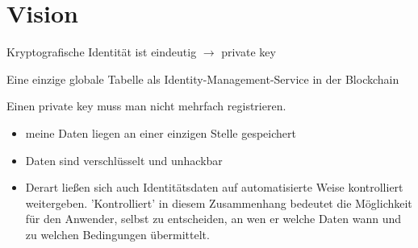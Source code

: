 \section{Vision}
\label{sec:vision}


\vspace{0.3cm}


\vspace{0.3cm}

\begin{Solution}

Kryptografische Identität ist eindeutig $\rightarrow$ private key

\end{Solution}

\vspace{0.3cm}


\begin{Solution}

Eine einzige globale Tabelle als Identity-Management-Service in der Blockchain

\end{Solution}

\vspace{0.3cm}


\begin{Solution}[mangelhafte UX]

Einen private key muss man nicht mehrfach registrieren.

\end{Solution}

\vspace{0.3cm}


\begin{Solution}[Datenschutz]

\begin{itemize}
  \item meine Daten liegen an einer einzigen Stelle gespeichert
  \item Daten sind verschlüsselt und unhackbar
  \item Derart ließen sich auch Identitätsdaten auf automatisierte Weise kontrolliert weitergeben. 'Kontrolliert' in diesem Zusammenhang bedeutet die Möglichkeit für den Anwender, selbst zu entscheiden, an wen er welche Daten wann und zu welchen Bedingungen übermittelt.
\end{itemize}

\end{Solution}

